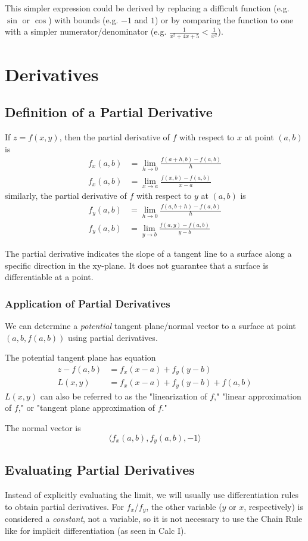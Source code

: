 \documentclass{article}
\begin{document}
This simpler expression could be derived by replacing a difficult function (e.g. $\sin$ or $\cos$) with bounds (e.g. $-1$ and $1$) or by comparing the function to one with a simpler numerator/denominator (e.g. $\frac{1}{x^2+4x+5} < \frac{1}{x^2}$).

\section{Derivatives}
\subsection{Definition of a Partial Derivative}
If $z=f(x,y)$, then the partial derivative of $f$ with respect to $x$ at point $(a,b)$ is
\begin{align*}
    f_x(a,b) &= \lim_{h\to0} \frac{f(a+h,b) - f(a,b)}{h} \\
    f_x(a,b) &= \lim_{x \to a} \frac{f(x,b)-f(a,b)}{x-a}
\end{align*}
similarly, the partial derivative of $f$ with respect to $y$ at $(a,b)$ is
\begin{align*}
    f_y(a,b) &= \lim_{h\to0} \frac{f(a,b+h) - f(a,b)}{h} \\
    f_y(a,b) &= \lim_{y \to b} \frac{f(a,y)-f(a,b)}{y-b}
\end{align*}

The partial derivative indicates the slope of a tangent line to a surface along a specific direction in the xy-plane. It does not guarantee that a surface is differentiable at a point.

\subsubsection{Application of Partial Derivatives}
We can determine a \emph{potential} tangent plane/normal vector to a surface at point $(a,b, f(a,b))$ using partial derivatives.

The potential tangent plane has equation
\begin{align*}
	z - f(a,b) &= f_x(x - a) + f_y(y - b)\\
	L(x,y) &= f_x(x-a) + f_y(y-b) + f(a,b)
\end{align*}
$L(x,y)$ can also be referred to as the "linearization of $f$," "linear approximation of $f$," or "tangent plane approximation of $f$."

The normal vector is
$$\langle f_x(a,b), f_y(a,b), -1 \rangle$$

\subsection{Evaluating Partial Derivatives}
Instead of explicitly evaluating the limit, we will usually use differentiation rules to obtain partial derivatives. For $f_x$/$f_y$, the other variable ($y$ or $x$, respectively) is considered a \emph{constant}, not a variable, so it is not necessary to use the Chain Rule like for implicit differentiation (as seen in Calc I).
\end{document}
